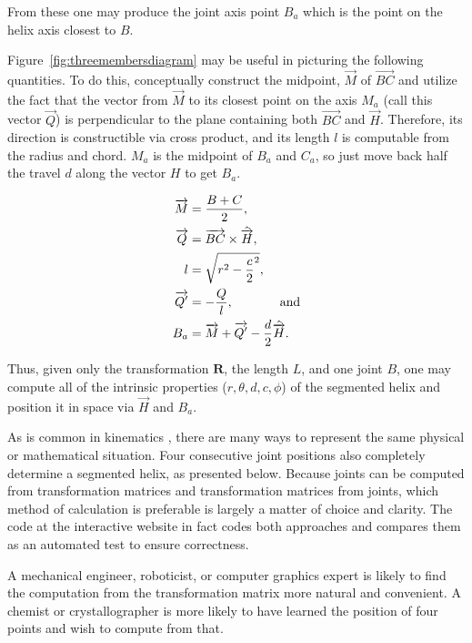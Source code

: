 \documentclass[mathematics,article,submit,pdftex,moreauthors]{Definitions/mdpi}
\begin{document}
From these one may produce the joint axis point $B_a$ which is the
point on the helix axis closest to $B$.

Figure~\ref{fig:threemembersdiagram}
may be useful in picturing the following quantities.
To do this, conceptually construct the midpoint,
$\overrightarrow{M}$
of $\overrightarrow{BC}$ and utilize the fact that the vector
from $\overrightarrow{M}$ to its closest point on the axis $M_a$ (call this vector $\overrightarrow{Q}$) is perpendicular
to the plane containing both $\overrightarrow{BC}$ and $\overrightarrow{H}$. Therefore,
its direction is constructible via cross product, and
its length $l$ is computable from the radius and chord. $M_a$
is the midpoint of $B_a$ and $C_a$, so just move back
half the travel $d$ along the vector $H$ to get $B_a$.

\begin{align}
  \overrightarrow{M} &= \frac{B + C}{2}, \\
  \overrightarrow{Q} &= \overrightarrow{BC} \times \hat{\overrightarrow{H}}, \\
  l &= \sqrt{r^2 - \frac{c}{2}^2}, \\
  \overrightarrow{Q'} &= -\frac{Q}{l}, \text{ \hspace{3em} and}\\
  B_a &= \overrightarrow{M} + \overrightarrow{Q'} - \frac{d}{2}\hat{\overrightarrow{H}}.
\end{align}

Thus, given only the transformation $\bm{R}$, the length $L$, and one
joint $B$, one may compute all of the intrinsic properties
($r,\theta,d,c,\phi$) of
the segmented helix and position it in space via $\overrightarrow{H}$ and $B_a$.

As is common in kinematics \cite{funda1990computational}, there are many ways to represent
the same physical or mathematical situation.
Four consecutive joint positions also completely determine a segmented helix, as presented below.
Because joints can be computed from transformation
matrices and transformation matrices from joints,
which method of calculation is preferable is largely
a matter of choice and clarity.
The code at the interactive website
in fact codes both approaches and compares them as an automated test to ensure
correctness.

A mechanical engineer, roboticist, or computer graphics expert is
likely to find the computation from the
transformation matrix more natural and convenient.
A chemist or crystallographer is more likely to
have learned the position of four points and wish to compute from that.
\end{document}
